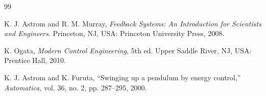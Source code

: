 \documentclass[conference]{IEEEtran}
\begin{document}
\begin{thebibliography}{99}

K. J. Astrom and R. M. Murray, \emph{Feedback Systems: An Introduction for Scientists and Engineers}. Princeton, NJ, USA: Princeton University Press, 2008.

K. Ogata, \emph{Modern Control Engineering}, 5th ed. Upper Saddle River, NJ, USA: Prentice Hall, 2010.

K. J. Astrom and K. Furuta, ``Swinging up a pendulum by energy control,'' \emph{Automatica}, vol. 36, no. 2, pp. 287--295, 2000.

\end{thebibliography}
\end{document}
